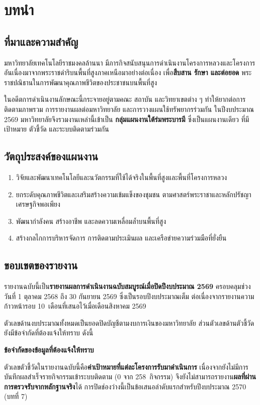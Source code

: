 \chapter{บทนำ}

\section{ที่มาและความสำคัญ}
มหาวิทยาลัยเทคโนโลยีราชมงคลล้านนา มีภารกิจสนับสนุนการดำเนินงานโครงการหลวงและโครงการ
อันเนื่องมาจากพระราชดำริบนพื้นที่สูงภาคเหนือมาอย่างต่อเนื่อง เพื่อ\textbf{สืบสาน รักษา และต่อยอด}
พระราชปณิธานในการพัฒนาคุณภาพชีวิตของประชาชนบนพื้นที่สูง

ในอดีตการดำเนินงานลักษณะนี้กระจายอยู่ตามคณะ สถาบัน และวิทยาเขตต่าง ๆ ทำให้ยากต่อการ
ติดตามภาพรวม การรายงานผลต่อมหาวิทยาลัย และการวางแผนใช้ทรัพยากรร่วมกัน ในปีงบประมาณ 2569
มหาวิทยาลัยจึงรวมงานเหล่านี้เข้าเป็น \textbf{กลุ่มแผนงานใต้ร่มพระบารมี} ซึ่งเป็นแผนงานเดียว
ที่มีเป้าหมาย ตัวชี้วัด และระบบติดตามร่วมกัน

\section{วัตถุประสงค์ของแผนงาน}
\begin{enumerate}[leftmargin=1.6em,itemsep=2pt]
  \item วิจัยและพัฒนาเทคโนโลยีและนวัตกรรมที่ใช้ได้จริงในพื้นที่สูงและพื้นที่โครงการหลวง
  \item ยกระดับคุณภาพชีวิตและเสริมสร้างความเข้มแข็งของชุมชน ตามศาสตร์พระราชาและหลักปรัชญาเศรษฐกิจพอเพียง
  \item พัฒนากำลังคน สร้างอาชีพ และลดความเหลื่อมล้ำบนพื้นที่สูง
  \item สร้างกลไกการบริหารจัดการ การติดตามประเมินผล และเครือข่ายความร่วมมือที่ยั่งยืน
\end{enumerate}

\section{ขอบเขตของรายงาน}
รายงานฉบับนี้เป็น\textbf{รายงานผลการดำเนินงานฉบับสมบูรณ์เมื่อปิดปีงบประมาณ 2569}
ครอบคลุมช่วงวันที่ 1 ตุลาคม 2568 ถึง 30 กันยายน 2569 ซึ่งเป็นรอบปีงบประมาณเต็ม
ต่อเนื่องจากรายงานความก้าวหน้ารอบ 10~เดือนที่เสนอไว้เมื่อเดือนสิงหาคม 2569

ตัวเลขด้านงบประมาณทั้งหมดเป็นยอดปิดบัญชีตามงบการเงินของมหาวิทยาลัย
ส่วนตัวเลขด้านตัวชี้วัดยังมีข้อจำกัดที่ต้องแจ้งให้ทราบ ดังนี้

\begin{infobox}
\textbf{ข้อจำกัดของข้อมูลที่ต้องแจ้งให้ทราบ}\par
ตัวเลขตัวชี้วัดในรายงานฉบับนี้คือ\textbf{ค่าเป้าหมายที่แต่ละโครงการรับมาดำเนินการ}
เนื่องจากยังไม่มีการบันทึกผลสำเร็จรายกิจกรรมเข้าระบบติดตาม (0 จาก 258~กิจกรรม)
จึงยังไม่สามารถรายงาน\textbf{ผลที่ผ่านการตรวจรับจากหลักฐานจริง}ได้
การปิดช่องว่างนี้เป็นข้อเสนอลำดับแรกสำหรับปีงบประมาณ 2570 (บทที่ 7)
\end{infobox}


